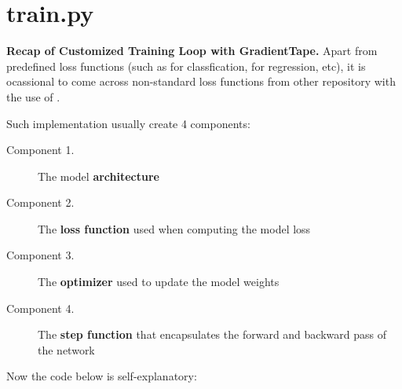 \documentclass[10pt,a4paper]{article}
\begin{document}
\section{train.py}
\textbf{Recap of Customized Training Loop with GradientTape.} Apart from predefined loss functions (such as  for classfication,  for regression, etc), it is ocassional to come across non-standard loss functions from other repository with the use of . 

Such implementation usually create 4 components:

\begin{description}
    \item[Component 1.] The model \textbf{architecture}
    \item[Component 2.] The \textbf{loss function} used when computing the model loss
    \item[Component 3.]  The \textbf{optimizer} used to update the model weights
    \item[Component 4.] The \textbf{step function} that encapsulates the forward and backward pass of the network
\end{description}

Now the code below is self-explanatory:
\end{document}
